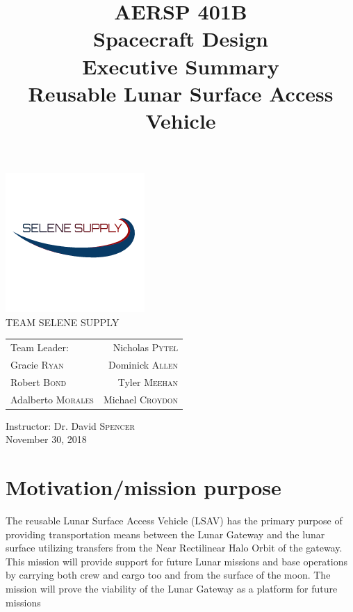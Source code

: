 \documentclass[10pt]{article}
\title{
  AERSP 401B \\
  Spacecraft Design \\
  Executive Summary \\
  Reusable Lunar Surface Access Vehicle \\
}
\date{}
\begin{document}
\doublespacing

\clearpage\maketitle
\thispagestyle{empty}

\begin{center}
  \includegraphics{SeleneSupplyLogo}\hspace*{\fill}\\  
  TEAM SELENE SUPPLY \\
  \begin{tabular}{l r}
    Team Leader: & Nicholas \textsc{Pytel} \\
    Gracie \textsc{Ryan} & Dominick \textsc{Allen} \\
    Robert \textsc{Bond} & Tyler \textsc{Meehan} \\
    Adalberto \textsc{Morales} & Michael \textsc{Croydon} \\
  \end{tabular}

  \hspace{1cm} \newline
  \hspace{1cm} \newline
  Instructor: Dr. David \textsc{Spencer} \\
  November 30, 2018
\end{center}

\newpage
\setcounter{page}{1}

\newpage

\section{Motivation/mission purpose}

The reusable Lunar Surface Access Vehicle (LSAV) has the primary
purpose of providing transportation means between the Lunar Gateway
and the lunar surface utilizing transfers from the Near Rectilinear
Halo Orbit of the gateway. This mission will provide support for
future Lunar missions and base operations by carrying both crew and
cargo too and from the surface of the moon. The mission will prove the
viability of the Lunar Gateway as a platform for future missions
\end{document}
